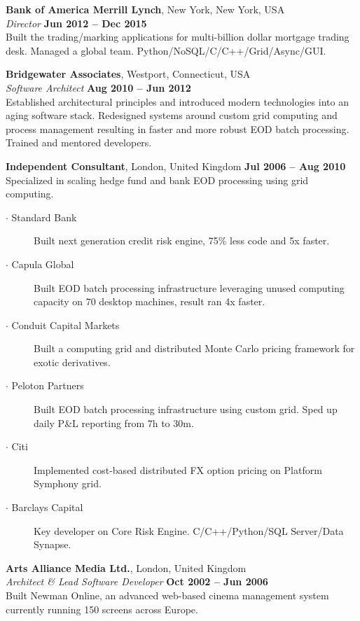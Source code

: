 \documentclass[margin,line]{resume}
\begin{document}
\begin{resume}
    \textbf{Bank of America Merrill Lynch}, New York, New York, USA\\
    \textsl{Director} \hfill \textbf{Jun 2012 -- Dec 2015}\\
    Built the trading/marking applications for multi-billion dollar mortgage trading desk. Managed a 
    global team. Python/NoSQL/C/C++/Grid/Async/GUI.
         
    \textbf{Bridgewater Associates}, Westport, Connecticut, USA\\
    \textsl{Software Architect} \hfill \textbf{Aug 2010 -- Jun 2012}\\
    Established architectural principles and introduced modern technologies into an aging software stack. 
    Redesigned systems around custom grid computing and process management resulting in faster and more 
    robust EOD batch processing. Trained and mentored developers. 

	\textbf{Independent Consultant}, London, United Kingdom \hfill \textbf{Jul 2006 -- Aug 2010}\\
    Specialized in scaling hedge fund and bank EOD processing using grid computing.\vspace{0mm}

    \begin{description}
    \item[$\cdot$ Standard Bank] Built next generation credit risk engine, 75\% less code and 5x faster. 
    \item[$\cdot$ Capula Global] Built EOD batch processing infrastructure leveraging unused
    computing capacity on 70 desktop machines, result ran 4x faster.
    \item[$\cdot$ Conduit Capital Markets] Built a computing grid and distributed Monte Carlo pricing framework for exotic derivatives.
    \item[$\cdot$ Peloton Partners] Built EOD batch processing infrastructure using custom grid. Sped up daily P\&L reporting from 7h to 30m.
    \item[$\cdot$ Citi] Implemented cost-based distributed FX option pricing on Platform Symphony grid.   
    \item[$\cdot$ Barclays Capital] Key developer on Core Risk Engine. C/C++/Python/SQL Server/Data Synapse.
    \end{description}    

    \textbf{Arts Alliance Media Ltd.}, London, United Kingdom\\
    \textsl{Architect \& Lead Software Developer} \hfill \textbf{Oct 2002 -- Jun 2006}\\
	Built Newman Online, an advanced web-based cinema management system currently running 150 screens across Europe.


\end{resume}
\end{document}
